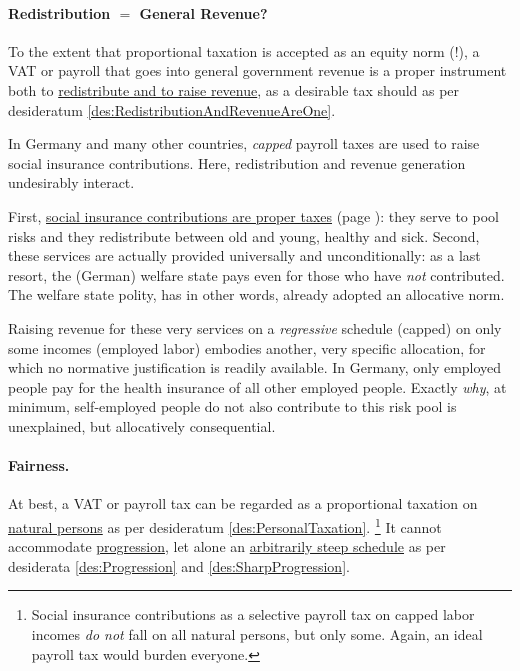 \paragraph{Redistribution $=$ General Revenue?}
To the extent that proportional taxation is accepted as an equity norm (!), a VAT or payroll that goes into general government revenue is a proper instrument both to \hyperref[des:RedistributionAndRevenueAreOne]{redistribute and to raise revenue}, as a desirable tax should as per desideratum \ref{des:RedistributionAndRevenueAreOne}.

In Germany and many other countries, \emph{capped} payroll taxes are used to raise social insurance contributions.
Here, redistribution and revenue generation undesirably interact.

First, \hyperref[sec:SICAreTaxes]{social insurance contributions are proper taxes} (page \pageref{sec:SICAreTaxes}):
they serve to pool risks and they redistribute between old and young, healthy and sick.
Second, these services are actually provided universally and unconditionally:
as a last resort, the (German) welfare state pays even for those who have \emph{not} contributed.
The welfare state polity, has in other words, already adopted an allocative norm.

Raising revenue for these very services on a \emph{regressive} schedule (capped) on only some incomes (employed labor) embodies another, very specific allocation, for which no normative justification is readily available.
In Germany, only employed people pay for the health insurance of all other employed people.
Exactly \emph{why}, at minimum, self-employed people do not also contribute to this risk pool is unexplained, but allocatively consequential.

\paragraph{Fairness.} At best, a VAT or payroll tax can be regarded as a proportional taxation on \hyperref[des:PersonalTaxation]{natural persons} as per desideratum \ref{des:PersonalTaxation}.
\footnote{
	Social insurance contributions as a selective payroll tax on capped labor incomes \emph{do not} fall on all natural persons, but only some.
	Again, an ideal payroll tax would burden everyone.
}
It cannot accommodate \hyperref[des:Progression]{progression}, let alone an \hyperref[des:SharpProgression]{arbitrarily steep schedule} as per  desiderata \ref{des:Progression} and \ref{des:SharpProgression}.

